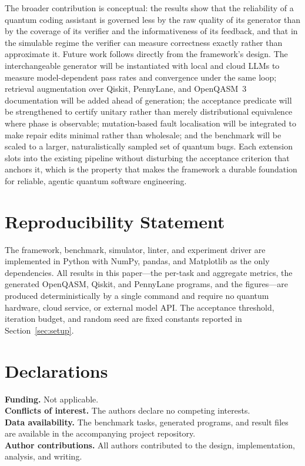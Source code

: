 \documentclass[11pt,a4paper]{article}
\begin{document}
The broader contribution is conceptual: the results show that the reliability of a quantum coding assistant is governed less by the raw quality of its generator than by the coverage of its verifier and the informativeness of its feedback, and that in the simulable regime the verifier can measure correctness exactly rather than approximate it. Future work follows directly from the framework's design. The interchangeable generator will be instantiated with local and cloud LLMs to measure model-dependent pass rates and convergence under the same loop; retrieval augmentation over Qiskit, PennyLane, and OpenQASM~3 documentation will be added ahead of generation; the acceptance predicate will be strengthened to certify unitary rather than merely distributional equivalence where phase is observable; mutation-based fault localisation will be integrated to make repair edits minimal rather than wholesale; and the benchmark will be scaled to a larger, naturalistically sampled set of quantum bugs. Each extension slots into the existing pipeline without disturbing the acceptance criterion that anchors it, which is the property that makes the framework a durable foundation for reliable, agentic quantum software engineering.

\section*{Reproducibility Statement}
The framework, benchmark, simulator, linter, and experiment driver are implemented in Python with NumPy, pandas, and Matplotlib as the only dependencies. All results in this paper---the per-task and aggregate metrics, the generated OpenQASM, Qiskit, and PennyLane programs, and the figures---are produced deterministically by a single command and require no quantum hardware, cloud service, or external model API. The acceptance threshold, iteration budget, and random seed are fixed constants reported in Section~\ref{sec:setup}.

\section*{Declarations}
\noindent\textbf{Funding.} Not applicable.\\
\textbf{Conflicts of interest.} The authors declare no competing interests.\\
\textbf{Data availability.} The benchmark tasks, generated programs, and result files are available in the accompanying project repository.\\
\textbf{Author contributions.} All authors contributed to the design, implementation, analysis, and writing.
\end{document}
